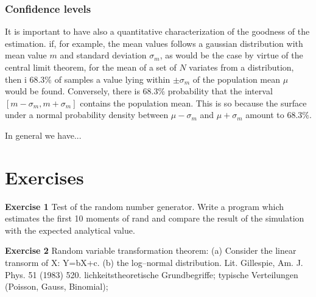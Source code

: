 \subsubsection{Confidence levels}
It is important to have also a quantitative characterization of the
goodness of the estimation. if, for example, the mean values follows a
gaussian distribution with mean value $m$ and standard deviation
$\sigma_m$,
as would be the case by virtue of the central limit theorem, for the
mean of a set of $N$ variates from a distribution, then i $68.3 \%$ of
samples a value lying within $\pm \sigma_m$  of the population mean
$\mu$ would be found. Conversely, there is $68.3 \%$ probability that
the interval $[m-\sigma_m, m+\sigma_m]$ contains the population mean.
This is so because the surface under a normal probability density
between  $\mu-\sigma_m$ and $\mu + \sigma_m$ amount to $68.3 \%$.

In general we have...










\section{Exercises}
{\bf Exercise 1} Test of the random number generator. Write a 
program which estimates the first 10 moments of rand and compare 
the result of the simulation with the expected analytical value.

{\bf Exercise 2} Random variable transformation theorem: (a) Consider 
the linear transorm of X: Y=bX+c. (b) the log--normal 
distribution.
Lit. Gillespie, Am. J. Phys. 51 (1983) 520.
lichkeitstheoretische Grundbegriffe; typische 
Verteilungen (Poisson, Gauss, Binomial); 

